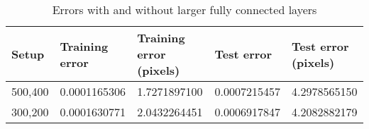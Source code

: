 \begin{table}[h!]
\centering
\footnotesize
\begin{tabular}{|l|l|l|l|l|}
	\hline
		\textbf{Setup} & \textbf{Training error} & \textbf{Training error (pixels)} & \textbf{Test error} & \textbf{Test error (pixels)}\\
	\hline
		500,400	& 0.0001165306%
				& 1.7271897100%
				& 0.0007215457%
				& 4.2978565150%
				\\
	\hline
		300,200	& 0.0001630771%
				& 2.0432264451%
				& 0.0006917847%
				& 4.2082882179%
				\\
	\hline
	\end{tabular}
	\normalsize
	\caption{Errors with and without larger fully connected layers}
	\label{tab:cnn_errors_largerfc}
\end{table}
